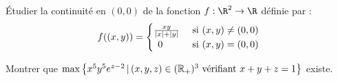 \documentclass[a4paper,twoside,french,11pt]{VcCours}
\begin{document}
\begin{Exercice}{} Étudier la continuité en $(0,0)$ de la fonction $f : \R^{2} \rightarrow \R$ définie par :
  \[
  f((x,y)) =
  \begin{cases}
    \frac{xy}{\vert x \vert + \vert y \vert} & \hbox{ si } (x,y) \neq (0,0) \\
    \, \; 0 & \hbox{ si } (x,y)=(0,0)
  \end{cases}
  \]
\end{Exercice}





\begin{Exercice}{} Montrer que $ \max \left\lbrace x^5y^5 e^{z-2} \, \vert \, (x,y,z) \in (\mathbb{R}_+)^3 \hbox{ vérifiant } x+y+z =1 \right\rbrace$ existe.
\end{Exercice}
\end{document}
